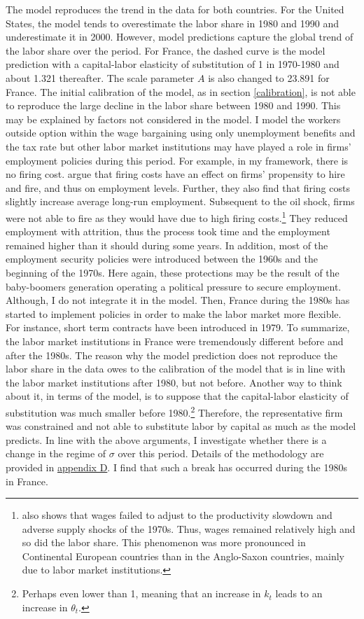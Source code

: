 \documentclass[
]{article}
\begin{document}
The model reproduces the trend in the data for both countries.
For the United States, the model tends to overestimate the labor share in 1980 and 1990 and underestimate it in 2000.
However, model predictions capture the global trend of the labor share over the period.
For France, the dashed curve is the model prediction with a capital-labor elasticity of substitution of 1 in 1970-1980 and about 1.321 thereafter. The scale parameter \(A\) is also changed to 23.891 for France. The initial calibration of the model, as in section \ref{calibration}, is not able to reproduce the large decline in the labor share between 1980 and 1990. This may be explained by factors not considered in the model.
I model the workers outside option within the wage bargaining using only unemployment benefits and the tax rate but other labor market institutions may have played a role in firms' employment policies during this period. For example, in my framework, there is no firing cost. \citet{Bentolila1990} argue that firing costs have an effect on firms' propensity to hire and fire, and thus on employment levels. Further, they also find that firing costs slightly increase average long-run employment. Subsequent to the oil shock, firms were not able to fire as they would have due to high firing costs.\footnote{\citet{Blanchard1997} also shows that wages failed to adjust to the productivity slowdown and adverse supply shocks of the 1970s. Thus, wages remained relatively high and so did the labor share. This phenomenon was more pronounced in Continental European countries than in the Anglo-Saxon countries, mainly due to labor market institutions.} They reduced employment with attrition, thus the process took time and the employment remained higher than it should during some years. In addition, most of the employment security policies were introduced between the 1960s and the beginning of the 1970s. Here again, these protections may be the result of the baby-boomers generation operating a political pressure to secure employment. Although, I do not integrate it in the model. Then, France during the 1980s has started to implement policies in order to make the labor market more flexible. For instance, short term contracts have been introduced in 1979. To summarize, the labor market institutions in France were tremendously different before and after the 1980s. The reason why the model prediction does not reproduce the labor share in the data owes to the calibration of the model that is in line with the labor market institutions after 1980, but not before. Another way to think about it, in terms of the model, is to suppose that the capital-labor elasticity of substitution was much smaller before 1980.\footnote{Perhaps even lower than 1, meaning that an increase in \(k_t\) leads to an increase in \(\theta_t\).} Therefore, the representative firm was constrained and not able to substitute labor by capital as much as the model predicts.
In line with the above arguments, I investigate whether there is a change in the regime of \(\sigma\) over this period. Details of the methodology are provided in \href{app-D}{appendix D}. I find that such a break has occurred during the 1980s in France.
\end{document}
